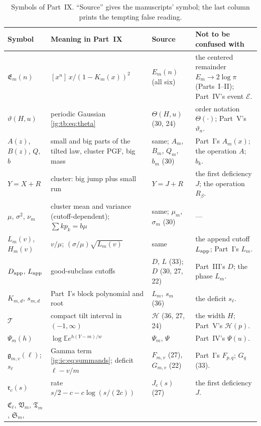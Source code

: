 \documentclass[11pt,a4paper]{article}
\theoremstyle{definition}\newaliascnt{definition}{theorem}
\theoremstyle{remark}\newaliascnt{remark}{theorem}
\newcommand{\ljE}{\mathbb E}
\begin{document}
\begin{table}[htbp]
\centering\footnotesize
\caption{Symbols of Part~IX. ``Source'' gives the manuscripts' symbol; the
last column prints the tempting false reading.}
\label{jg:tab:notation}
\begin{tabular}{@{}>{\raggedright}p{.17\linewidth}>{\raggedright}p{.31\linewidth}>{\raggedright}p{.17\linewidth}>{\raggedright\arraybackslash}p{.26\linewidth}@{}}
\toprule
Symbol & Meaning in Part~IX & Source & Not to be confused with\\
\midrule
$\mathfrak E_m(n)$ & $[x^n]\,x/(1-K_m(x))^2$ & $E_m(n)$ (all six) & the
 centered remainder $E_m\to2\log\pi$ (Parts~I--II); Part~IV's event
 $\mathcal E$.\\
$\vartheta(H,u)$ & periodic Gaussian \eqref{jg:tb:eq:theta} & $\Theta(H,u)$
 (30, 24) & order notation $\Theta(\cdot)$; Part~V's $\vartheta_n$.\\
$A(z)$, $B(z)$, $Q$, $b$ & small and big parts of the tilted law, cluster
 PGF, big mass & same; $A_m$, $B_m$, $Q_m$, $b_m$ (30) & Part~I's $A_m(x)$;
 the operation $A$; $b_k$.\\
$Y=X+R$ & cluster: big jump plus small run & $Y=J+R$ & the first deficiency
 $J$; the operation $R_\beta$.\\
$\mu$, $\sigma^2$, $\nu_m$ & cluster mean and variance (cutoff-dependent);
 $\sum kp_k=b\mu$ & same; $\mu_m$, $\sigma_m$ (30) & ---\\
$L_m(v)$, $H_m(v)$ & $v/\mu$; $(\sigma/\mu)\sqrt{L_m(v)}$ & same & the append
 cutoff $L_{\rm app}$; Part~I's $L_m$.\\
$D_{\rm app}$, $L_{\rm app}$ & good-subclass cutoffs & $D$, $L$ (33);
 $D$ (30, 27, 22) & Part~III's $D$; the phase $L_m$.\\
$K_{m,d}$, $s_{m,d}$ & Part~I's block polynomial and root &
 $L_m$, $s_m$ (36) & the deficit $s_\ell$.\\
$\mathcal T$ & compact tilt interval in $(-1,\infty)$ & $\mathcal H$ (36,
 27, 24) & the width $H$; Part~V's $\mathcal H(p)$.\\
$\Psi_m(h)$ & $\log\ljE e^{h(Y-m)/w}$ & $\Psi_m$, $\Psi$ & Part~IV's $\Psi(u)$.\\
$\mathfrak g_{m,v}(\ell)$; $s_\ell$ & Gamma term \eqref{jg:ic:eq:summands};
 deficit $\ell-v/m$ & $F_{m,v}$ (27), $G_{m,v}$ (22) & Part~I's $F_{p,q}$;
 $G_q$ (33).\\
$\mathfrak r_c(s)$ & rate $s/2-c-c\log(s/(2c))$ & $J_c(s)$ (27) & the first
 deficiency $J$.\\
$\mathfrak C_\ell$, $\mathfrak V_m$, $\mathfrak T_m$, $\mathfrak S_m$,

\end{tabular}
\end{table}
\end{document}
